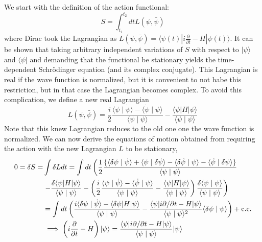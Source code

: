 We start with the definition of the action functional:
\begin{equation}
    S=\int_{t_1}^{t_2} d t L(\psi, \bar{\psi})
\end{equation}
where Dirac took the Lagrangian as $L(\psi, \bar{\psi})=\langle\psi(t)| i \frac{\partial}{\partial t}-H|\psi(t)\rangle$. It can be shown that taking arbitrary independent variations of $S$ with respect to $|\psi\rangle$ and $\langle\psi|$ and demanding that the functional be stationary yields the time-dependent Schrödinger equation (and its complex conjugate). This Lagrangian is real if the wave function is normalized, but it is convenient to not habe this restriction, but in that case the Lagrangian becomes complex. To avoid this complication, we define a new real Lagrangian
\begin{equation}
    L(\psi, \bar{\psi})=\frac{i}{2} \frac{\langle\psi \mid \dot{\psi}\rangle-\langle\dot{\psi} \mid \psi\rangle}{\langle\psi \mid \psi\rangle}-\frac{\langle\psi| H|\psi\rangle}{\langle\psi \mid \psi\rangle}
\end{equation}
Note that this knew Lagrangian reduces to the old one one the wave function is normalized. We can now derive the equations of motion obtained from requiring the action with the new Lagrangian $L$ to be stationary,
\begin{align}
0 =\delta S= & \int \delta L d t=\int d t\left(\frac{1}{2} \frac{\{\langle\delta \psi \mid \dot{\psi}\rangle+\langle\psi \mid \delta \dot{\psi}\rangle-\langle\delta \dot{\psi} \mid \psi\rangle-\langle\dot{\psi} \mid \delta \psi\rangle\}}{\langle\psi \mid \psi\rangle}\right. \\
& \left.-\frac{\delta\langle\psi| H|\psi\rangle}{\langle\psi \mid \psi\rangle}-\left(\frac{i}{2} \frac{\langle\psi \mid \dot{\psi}\rangle-\langle\dot{\psi} \mid \psi\rangle}{\langle\psi \mid \psi\rangle}-\frac{\langle\psi| H|\psi\rangle}{\langle\psi \mid \psi\rangle}\right) \frac{\delta\langle\psi \mid \psi\rangle}{\langle\psi \mid \psi\rangle}\right) \notag\\
&= \int d t\left(\frac{i\langle\delta \psi \mid \dot{\psi}\rangle-\langle\delta \psi| H|\psi\rangle}{\langle\psi \mid \psi\rangle}-\frac{\langle\psi| i \partial / \partial t-H|\psi\rangle}{\langle\psi \mid \psi\rangle^2}\langle\delta \psi \mid \psi\rangle\right) + \text{c.c.} \\
&\implies \left(i \frac{\partial}{\partial t}-H\right)|\psi\rangle=\frac{\langle\psi| i \partial / \partial t-H|\psi\rangle}{\langle\psi \mid \psi\rangle}|\psi\rangle
\label{eq:tdvp1}
\end{align}

